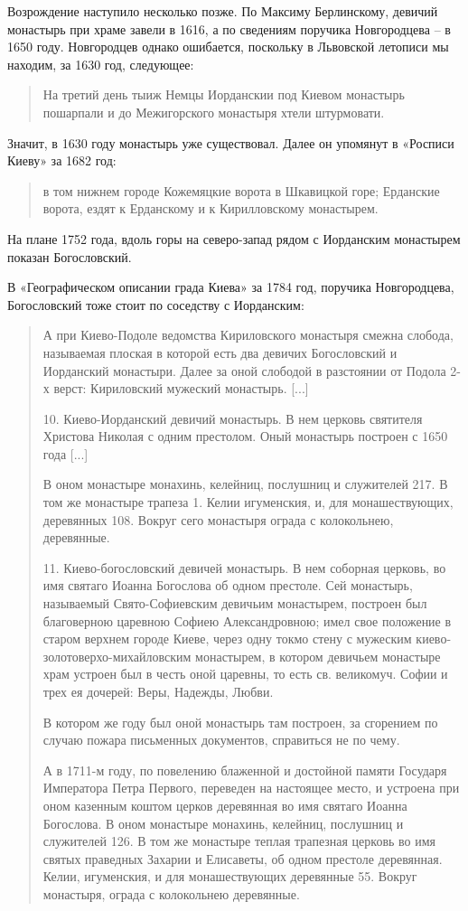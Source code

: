 Возрождение наступило несколько позже. По Максиму Берлинскому, девичий монастырь при храме завели в 1616, а по сведениям поручика Новгородцева – в 1650 году. Новгородцев однако ошибается, поскольку в Львовской летописи мы находим, за 1630 год, следующее:

\begin{quotation}
На третий день тыиж Немцы Иорданскии под Киевом монастырь пошарпали и до Межигорского монастыря хтели штурмовати.
\end{quotation}

Значит, в 1630 году монастырь уже существовал. Далее он упомянут в «Росписи Киеву» за 1682 год:

\begin{quotation}
в том нижнем городе Кожемяцкие ворота в Шкавицкой горе; Ерданские ворота, ездят к Ерданскому и к Кирилловскому монастырем.
\end{quotation}

На плане 1752 года, вдоль горы на северо-запад рядом с Иорданским монастырем показан Богословский. 

В «Географическом описании града Киева» за 1784 год, поручика Новгородцева, Богословский тоже стоит по соседству с Иорданским: 

\begin{quotation}
А при Киево-Подоле ведомства Кириловского монастыря смежна слобода, называемая плоская в которой есть два девичих Богословский и Иорданский монастыри. Далее за оной слободой в разстоянии от Подола 2-х верст: Кириловский мужеский монастырь. [...]

10. Киево-Иорданский девичий монастырь. В нем церковь святителя Христова Николая с одним престолом. Оный монастырь построен с 1650 года [...] 

В оном монастыре монахинь, келейниц, послушниц и служителей 217. В том же монастыре трапеза 1. Келии игуменския, и, для монашествующих, деревянных 108. Вокруг сего монастыря ограда с колокольнею, деревянные.

11. Киево-богословский девичей монастырь. В нем соборная церковь, во имя святаго Иоанна Богослова об одном престоле. Сей монастырь, называемый Свято-Софиевским девичьим монастырем, построен был благоверною царевною Софиею Александровною; имел свое положение в старом верхнем городе Киеве, через одну токмо стену с мужеским киево-золото\-верхо-михайловским монастырем, в котором девичьем монастыре храм устроен был в честь оной царевны, то есть св. великомуч. Софии и трех ея дочерей: Веры, Надежды, Любви. 

В котором же году был оной монастырь там построен, за сгорением по случаю пожара письменных документов, справиться не по чему. 

А в 1711-м году, по повелению блаженной и достойной памяти Государя Императора Петра Первого, переведен на настоящее место, и устроена при оном казенным коштом церков деревянная во имя святаго Иоанна Богослова. В оном монастыре монахинь, келейниц, послушниц и служителей 126. В том же монастыре теплая трапезная церковь во имя святых праведных Захарии и Елисаветы, об одном престоле деревянная. Келии, игуменския, и для монашествующих деревянные 55. Вокруг монастыря, ограда с колокольнею деревянные.
\end{quotation}

